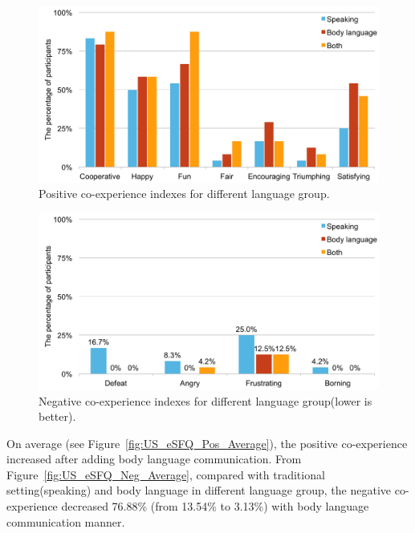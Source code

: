 

\begin{figure}[!h]
\centering
\includegraphics[width=0.9\columnwidth]{Figures/US_Co-ex_Dif_Pos.pdf}
\caption{Positive co-experience indexes for different language group.}
\label{fig:US_Co-ex_Dif_Pos}
\end{figure}

\begin{figure}[!h]
\centering
\includegraphics[width=0.9\columnwidth]{Figures/US_Co-ex_Dif_Neg.pdf}
\caption{Negative co-experience indexes for different language group(lower is better).}
\label{fig:US_Co-ex_Dif_Neg}
\end{figure}

On average (see Figure~\ref{fig:US_eSFQ_Pos_Average}), the positive co-experience increased after adding body language communication. From Figure~\ref{fig:US_eSFQ_Neg_Average}, compared with traditional setting(speaking) and body language in different language group, the negative co-experience decreased 76.88\% (from 13.54\% to 3.13\%) with body language communication manner.

